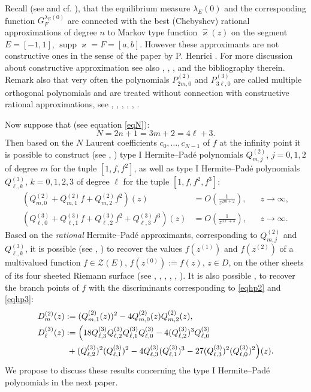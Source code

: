 \documentclass[11pt, a4paper, twoside]{article}
\def\({\left(}
\def\){\right)}
\let\myh\widehat
\def\supp{\operatorname{supp}}
\theoremstyle{plain}
\theoremstyle{definition}
\begin{document}
Recall (see \cite{GoRaSu91} and cf. \cite{MaMe24}), that the equilibrium measure   $\lambda_E(0)$ and the corresponding function $G ^ {\lambda_E(0)}_F$ are connected with the best (Chebyshev) rational approximations 
of degree $n$ to Markov type function $\myh{\varkappa}(z)$ on the segment $E=[-1,1]$, $\supp{\varkappa}=F=[a,b]$. However these approximants are not constructive   ones in the sense of the paper by P. Henrici \cite[Sec. 2]{Hen66}. For more discussion about constructive approximation see also \cite{Ara84}, \cite{Sta06}, \cite{Tre23}, \cite{AnAv24} and the bibliography therein. Remark also that very often the polynomials $P^{(2)}_{2m,0}$ and $P^{(3)}_{3\ell,0}$ are called multiple orthogonal polynomials and  are treated without connection with constructive rational approximations, see \cite{ApLy10}, \cite{ApLy21}, \cite{Lys20}, \cite{Lys24}, \cite{ApNo25}, \cite{Apt26}.

Now suppose that (see equation \eqref{eqN}):
\begin{equation}
N=2n+1=3m+2=4\ell+3.
\label{qeNN}
\end{equation}
Then based on the $N$ Laurent coefficients $c_0,\dots,c_{N-1}$ of $f$ at the infinity point it is possible to construct (see \cite{NiSo88}, \cite{IkSu21}) type I Hermite--Padé polynomials  $Q^{(2)}_{m,j}$, $j=0,1,2$ of degree $m$ for the tuple $[1,f,f^2]$, as well as type I Hermite--Padé polynomials  $Q^{(3)}_{\ell,k}$, $k=0,1,2,3$ of degree $\ell$ for the tuple $[1,f,f^2,f^3]$:
\begin{align}
(Q^{(2)}_{m,0}+Q^{(2)}_{m,1}f+Q^{(2)}_{m,2}f^2)(z)&=O\(\frac1{z^{2m+2}}\),&& z\to\infty,\label{eqhp2}\\
(Q^{(3)}_{\ell,0}+Q^{(3)}_{\ell,1}f+Q^{(3)}_{\ell,2}f^2+Q^{(3)}_{\ell,3}f^3)(z)&=O\(\frac1{z^{3\ell+3}}\),&& z\to\infty.
\label{eqhp3}
\end{align}
Based on the {\it rational} Hermite--Padé approximants, corresponding to $Q^{(2)}_{m,j}$ and $Q^{(3)}_{\ell,k}$, it is possible (see \cite{Sue18d}, \cite{Kom21}) to recover the values $f(z^{(1)})$ and $f(z^{(2)})$ of a multivalued function $f\in\mathscr Z(E)$, $f(z^{(0)}):=f(z)$, $z\in D$, on the other sheets of its four sheeted Riemann surface (see \cite{KoPaSuCh17}, \cite{Sue18d}, \cite{IkSu21}, \cite{Kom21}, \cite{Sue23}, \cite{Sue24}). It is also possible \cite{IkSuHePa21}, \cite{KoPa24} to recover the branch points of $f$ with the discriminants corresponding to \eqref{eqhp2} and \eqref{eqhp3}:
\begin{align}
D_m^{(2)}(z)&:=(Q^{(2)}_{m,1}(z))^2-4Q^{(2)}_{m,0}(z)Q^{(2)}_{m,2}(z),\label{eqdis2}\\
D_\ell^{(3)}(z)&:=\Bigl(18Q^{(3)}_{\ell,3}Q^{(3)}_{\ell,2}Q^{(3)}_{\ell,1}Q^{(3)}_{\ell,0}-4(Q^{(3)}_{\ell,2})^3Q^{(3)}_{\ell,0}\nonumber\\
&\phantom{:}+(Q^{(3)}_{\ell,2})^2(Q^{(3)}_{\ell,1})^2-4Q^{(3)}_{\ell,3}(Q^{(3)}_{\ell,1})^3-27(Q^{(3)}_{\ell,3})^2(Q^{(3)}_{\ell,0})^2\Bigr)(z).\label{eqdis3}
\end{align}
We propose to discuss these results concerning the type I Hermite--Padé polynomials in the next paper.
\end{document}
